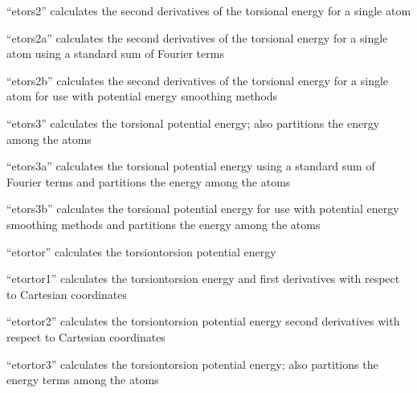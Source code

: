\documentclass[letterpaper,11pt,english]{sphinxmanual}
\begin{document}
\sphinxAtStartPar
{}

\sphinxAtStartPar
“etors2” calculates the second derivatives of the torsional energy for a single atom

\sphinxAtStartPar
{}

\sphinxAtStartPar
“etors2a” calculates the second derivatives of the torsional energy for a single atom using a standard sum of Fourier terms

\sphinxAtStartPar
{}

\sphinxAtStartPar
“etors2b” calculates the second derivatives of the torsional energy for a single atom for use with potential energy smoothing methods

\sphinxAtStartPar
{}

\sphinxAtStartPar
“etors3” calculates the torsional potential energy; also partitions the energy among the atoms

\sphinxAtStartPar
{}

\sphinxAtStartPar
“etors3a” calculates the torsional potential energy using a standard sum of Fourier terms and partitions the energy among the atoms

\sphinxAtStartPar
{}

\sphinxAtStartPar
“etors3b” calculates the torsional potential energy for use with potential energy smoothing methods and partitions the energy among the atoms

\sphinxAtStartPar
{}

\sphinxAtStartPar
“etortor” calculates the torsion\sphinxhyphen{}torsion potential energy

\sphinxAtStartPar
{}

\sphinxAtStartPar
“etortor1” calculates the torsion\sphinxhyphen{}torsion energy and first derivatives with respect to Cartesian coordinates

\sphinxAtStartPar
{}

\sphinxAtStartPar
“etortor2” calculates the torsion\sphinxhyphen{}torsion potential energy second derivatives with respect to Cartesian coordinates

\sphinxAtStartPar
{}

\sphinxAtStartPar
“etortor3” calculates the torsion\sphinxhyphen{}torsion potential energy; also partitions the energy terms among the atoms
\end{document}
